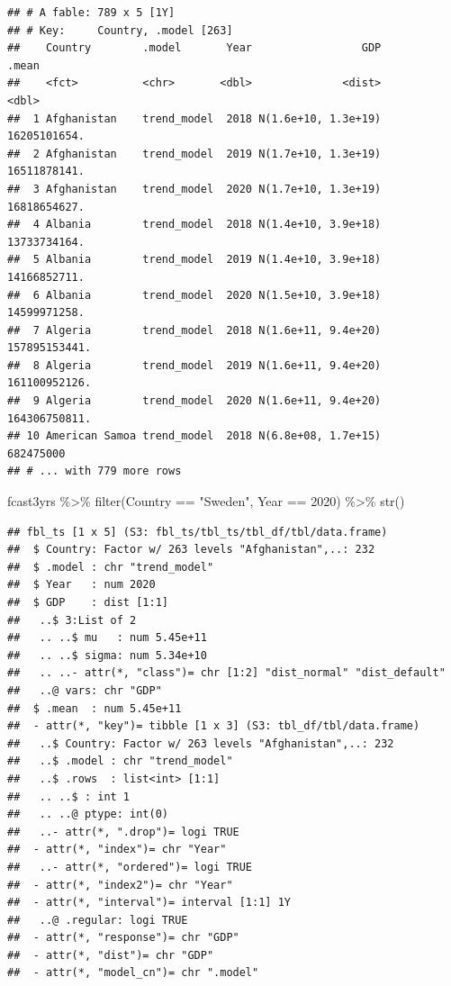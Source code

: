 \documentclass[
]{book}
\newenvironment{Shaded}{\begin{snugshade}}{\end{snugshade}}
\newcommand{\DecValTok}[1]{\textcolor[rgb]{0.00,0.00,0.81}{#1}}
\newcommand{\FunctionTok}[1]{\textcolor[rgb]{0.00,0.00,0.00}{#1}}
\newcommand{\NormalTok}[1]{#1}
\newcommand{\SpecialCharTok}[1]{\textcolor[rgb]{0.00,0.00,0.00}{#1}}
\newcommand{\StringTok}[1]{\textcolor[rgb]{0.31,0.60,0.02}{#1}}
\begin{document}
\begin{verbatim}
## # A fable: 789 x 5 [1Y]
## # Key:     Country, .model [263]
##    Country        .model       Year                 GDP         .mean
##    <fct>          <chr>       <dbl>              <dist>         <dbl>
##  1 Afghanistan    trend_model  2018 N(1.6e+10, 1.3e+19)  16205101654.
##  2 Afghanistan    trend_model  2019 N(1.7e+10, 1.3e+19)  16511878141.
##  3 Afghanistan    trend_model  2020 N(1.7e+10, 1.3e+19)  16818654627.
##  4 Albania        trend_model  2018 N(1.4e+10, 3.9e+18)  13733734164.
##  5 Albania        trend_model  2019 N(1.4e+10, 3.9e+18)  14166852711.
##  6 Albania        trend_model  2020 N(1.5e+10, 3.9e+18)  14599971258.
##  7 Algeria        trend_model  2018 N(1.6e+11, 9.4e+20) 157895153441.
##  8 Algeria        trend_model  2019 N(1.6e+11, 9.4e+20) 161100952126.
##  9 Algeria        trend_model  2020 N(1.6e+11, 9.4e+20) 164306750811.
## 10 American Samoa trend_model  2018 N(6.8e+08, 1.7e+15)    682475000 
## # ... with 779 more rows
\end{verbatim}

\begin{Shaded}
\begin{Highlighting}[]
\NormalTok{fcast3yrs }\SpecialCharTok{\%\textgreater{}\%} \FunctionTok{filter}\NormalTok{(Country }\SpecialCharTok{==} \StringTok{"Sweden"}\NormalTok{, Year }\SpecialCharTok{==} \DecValTok{2020}\NormalTok{) }\SpecialCharTok{\%\textgreater{}\%} \FunctionTok{str}\NormalTok{()}
\end{Highlighting}
\end{Shaded}

\begin{verbatim}
## fbl_ts [1 x 5] (S3: fbl_ts/tbl_ts/tbl_df/tbl/data.frame)
##  $ Country: Factor w/ 263 levels "Afghanistan",..: 232
##  $ .model : chr "trend_model"
##  $ Year   : num 2020
##  $ GDP    : dist [1:1] 
##   ..$ 3:List of 2
##   .. ..$ mu   : num 5.45e+11
##   .. ..$ sigma: num 5.34e+10
##   .. ..- attr(*, "class")= chr [1:2] "dist_normal" "dist_default"
##   ..@ vars: chr "GDP"
##  $ .mean  : num 5.45e+11
##  - attr(*, "key")= tibble [1 x 3] (S3: tbl_df/tbl/data.frame)
##   ..$ Country: Factor w/ 263 levels "Afghanistan",..: 232
##   ..$ .model : chr "trend_model"
##   ..$ .rows  : list<int> [1:1] 
##   .. ..$ : int 1
##   .. ..@ ptype: int(0) 
##   ..- attr(*, ".drop")= logi TRUE
##  - attr(*, "index")= chr "Year"
##   ..- attr(*, "ordered")= logi TRUE
##  - attr(*, "index2")= chr "Year"
##  - attr(*, "interval")= interval [1:1] 1Y
##   ..@ .regular: logi TRUE
##  - attr(*, "response")= chr "GDP"
##  - attr(*, "dist")= chr "GDP"
##  - attr(*, "model_cn")= chr ".model"
\end{verbatim}
\end{document}
